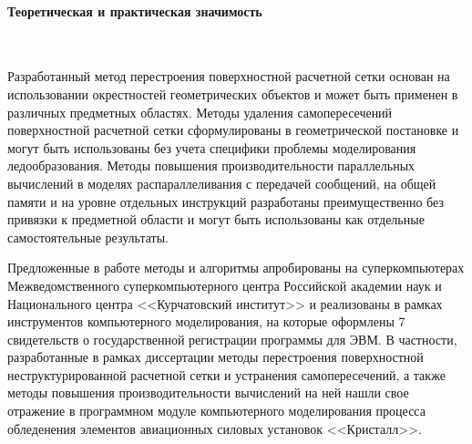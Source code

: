 \paragraph{Теоретическая и практическая значимость} \

Разработанный метод перестроения поверхностной расчетной сетки основан на использовании окрестностей геометрических объектов и может быть применен в различных предметных областях.
Методы удаления самопересечений поверхностной расчетной сетки сформулированы в геометрической постановке и могут быть использованы без учета специфики проблемы моделирования ледообразования.
Методы повышения производительности параллельных вычислений в моделях распараллеливания с передачей сообщений, на общей памяти и на уровне отдельных инструкций разработаны преимущественно без привязки к предметной области и могут быть использованы как отдельные самостоятельные результаты.

Предложенные в работе методы и алгоритмы апробированы на суперкомпьютерах Межведомственного суперкомпьютерного центра Российской академии наук и Национального центра <<Курчатовский институт>> и реализованы в рамках инструментов компьютерного моделирования, на которые оформлены 7 свидетельств о государственной регистрации программы для ЭВМ.
В частности, разработанные в рамках диссертации методы перестроения поверхностной неструктурированной расчетной сетки и устранения самопересечений, а также методы повышения производительности вычислений на ней нашли свое отражение в программном модуле компьютерного моделирования процесса обледенения элементов авиационных силовых установок <<Кристалл>>.
